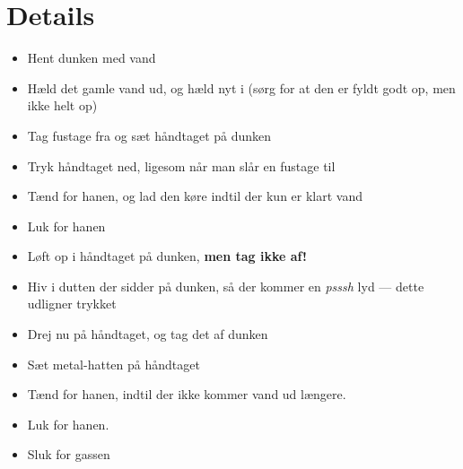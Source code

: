 \section{Details}
\begin{itemize}
  \item Hent dunken med vand
  \item Hæld det gamle vand ud, og hæld nyt i (sørg for at den er
    fyldt godt op, men ikke helt op)
  \item Tag fustage fra og sæt håndtaget på dunken
  \item Tryk håndtaget ned, ligesom når man slår en fustage til
  \item Tænd for hanen, og lad den køre indtil der kun er klart vand
  \item Luk for hanen
  \item Løft op i håndtaget på dunken, \textbf{men tag ikke af!}
  \item Hiv i dutten der sidder på dunken, så der kommer en
    \textit{psssh} lyd --- dette udligner trykket
  \item Drej nu på håndtaget, og tag det af dunken
  \item Sæt metal-hatten på håndtaget
  \item Tænd for hanen, indtil der ikke kommer vand ud
    længere.
  \item Luk for hanen.
  \item Sluk for gassen
\end{itemize}




